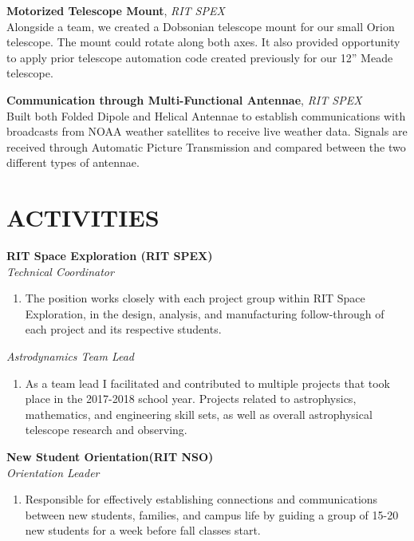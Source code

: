 \documentclass[line, resmargin]{res}
\begin{document}
\begin{resume}
\textbf{Motorized Telescope Mount}, \textit{RIT SPEX}\\
Alongside a team, we created a Dobsonian telescope mount for our small Orion telescope. The mount could rotate along both axes. It also provided opportunity to apply prior telescope automation code created previously for our 12” Meade telescope.\\

\vspace{-7mm}

\textbf{Communication through Multi-Functional Antennae}, \textit{RIT SPEX}\\
Built both Folded Dipole and Helical Antennae to establish communications with broadcasts from NOAA weather satellites to receive live weather data. Signals are received through Automatic Picture Transmission and compared between the two different types of antennae. 

\vspace{-2.5mm}

\section{ACTIVITIES}
\textbf{RIT Space Exploration (RIT SPEX)}\\
\textit {Technical Coordinator}
\vspace{-6mm}
	\begin{enumerate}
		\item[]The position works closely with each project group within RIT Space Exploration, in the design, analysis, and manufacturing follow-through of each project and its respective students.
	\end{enumerate}
\vspace{-6mm}
\textit {Astrodynamics Team Lead}
\vspace{-6mm}
      \begin{enumerate}
        \item[] As a team lead I facilitated and contributed to multiple projects that took place in the 2017-2018 school year. Projects related to astrophysics, mathematics, and engineering skill sets, as well as overall astrophysical telescope research and observing. 
      \end{enumerate}
\vspace{-4mm}
\textbf{New Student Orientation(RIT NSO)}\\
\textit {Orientation Leader}
\vspace{-6mm}
	\begin{enumerate}
		\item[]Responsible for effectively establishing connections and communications between new students, families, and campus life by guiding a group of 15-20 new students for a week before fall classes start.
	\end{enumerate}


\end{resume}
\end{document}
